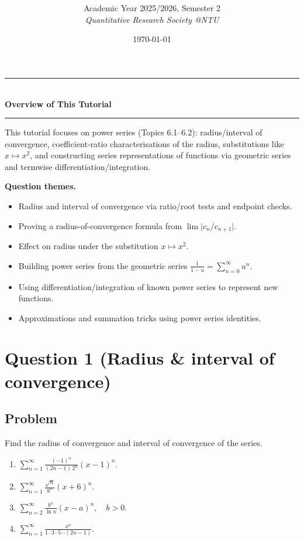 \documentclass[12pt]{article}
\title{
\CourseCode \CourseName \\[0.3em]
\large \DocType
}
\author{
  Academic Year 2025/2026, Semester 2 \\[0.25em]
  \textit{Quantitative Research Society @NTU}
}
\date{\today}
\newcommand{\ds}{\displaystyle}
\begin{document}
\maketitle
\thispagestyle{plainfirst}
\pagestyle{main}
\bigskip

\begin{center}
  \rule{0.8\textwidth}{0.4pt}\\[4pt]
  \textbf{Overview of This Tutorial}\\[2pt]
  \rule{0.8\textwidth}{0.4pt}
\end{center}

\noindent
This tutorial focuses on power series (Topics 6.1--6.2): radius/interval of convergence, coefficient-ratio characterisations of the radius, substitutions like \(x\mapsto x^2\), and constructing series representations of functions via geometric series and termwise differentiation/integration.

\noindent
\textbf{Question themes.}
\begin{itemize}[leftmargin=*]
  \item Radius and interval of convergence via ratio/root tests and endpoint checks.
  \item Proving a radius-of-convergence formula from \(\lim \bigl|c_n/c_{n+1}\bigr|\).
  \item Effect on radius under the substitution \(x\mapsto x^2\).
  \item Building power series from the geometric series \(\frac{1}{1-u}=\sum_{n=0}^\infty u^n\).
  \item Using differentiation/integration of known power series to represent new functions.
  \item Approximations and summation tricks using power series identities.
\end{itemize}

\bigskip


\newpage
\section*{Question 1 (Radius \& interval of convergence)}
\subsection*{Problem}
Find the radius of convergence and interval of convergence of the series.
\begin{enumerate}[label=(\alph*)]
  \item \(\ds \sum_{n=1}^{\infty}\frac{(-1)^n}{(2n-1)\,2^n}(x-1)^n.\)
  \item \(\ds \sum_{n=1}^{\infty}\frac{\sqrt{n}}{8^n}(x+6)^n.\)
  \item \(\ds \sum_{n=2}^{\infty}\frac{b^n}{\ln n}(x-a)^n,\quad b>0.\)
  \item \(\ds \sum_{n=1}^{\infty}\frac{x^n}{1\cdot 3\cdot 5\cdots (2n-1)}.\)
\end{enumerate}
\end{document}
